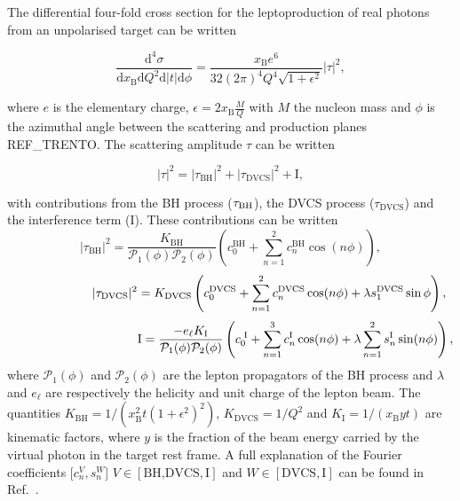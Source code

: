 The differential four-fold cross section for the leptoproduction of real photons
from an unpolarised target can be written \cite{Belitsky2002}
\begin{center}
\begin{equation}
\frac{\textrm{d}^4\sigma}{\textrm{d}x_{\textrm{B}}\textrm{d}Q^{2}\textrm{d}
|t|\textrm{d}\phi} =
\frac{x_{\textrm{B}}e^{6}}{32(2\pi)^{4} Q^{4}\sqrt{1+\epsilon^{2}}}
|\tau|^{2},
\end{equation}
\end{center}
where $e$ is the elementary
charge, $\epsilon=2x_\textrm{B}\frac{M}{Q}$ with $M$
the nucleon mass and $\phi$ is the
azimuthal angle between the scattering and production planes REF\_TRENTO.
The scattering amplitude $\tau$ can be written
\begin{center}
\begin{equation}
|\tau|^{2} = |\tau_{\textrm{BH}}|^{2} +
|\tau_{\textrm{DVCS}}|^{2} + \textrm{I},
\end{equation}
\end{center}
with contributions from the \textrm{BH} process ($\tau_{\textrm{\textrm{BH}}}$),
the DVCS process
($\tau_{\textrm{DVCS}}$) and the interference term (I). These
contributions can be written 
\begin{equation}
 |\tau_{\textrm{BH}}|^{2} =
\frac{K_{\textrm{BH}}}{\mathcal{P}_{1}(\phi)\mathcal{P}_{2}(\phi)}
\left(c_{0}^{
\textrm{BH}} + \sum_{n=1}^2 c_{n}^{\textrm{BH}}\cos(n\phi)\right),
\label{e:tbh}
\end{equation}
\begin{equation}
 \hspace{2.2cm}|\tau_{\textrm{DVCS}}|^{2} =
K_{\textrm{DVCS}}\left(c_{0}^{\textrm{DVCS}} +
\sum_{n=1}^2
c_{n}^{\textrm{DVCS}}\cos(n\phi) + \lambda
s_{1}^{\textrm{DVCS}}\sin\phi\right),
\label{e:tdvcs}
\end{equation}
\begin{equation}
\hspace{3.7cm} \textrm{I} = \frac{- e_\ell
K_{\textrm{I}}}{\mathcal{P}_{1}(\phi)\mathcal{P}_{2}(\phi)}\left(c_{0}^{\textrm{
I}}
+
\sum_{n=1}^3 c_{n}^{\textrm{I}}\cos(n\phi) + \lambda \sum_{n=1}^2
s_{n}^{\textrm{I}}\sin(n\phi)\right),
\label{e:ti}
\end{equation}
where $\mathcal{P}_1(\phi)$ and $\mathcal{P}_2(\phi)$ are the lepton propagators
of the BH process and $\lambda$ and $e_\ell$ are respectively the
helicity and unit charge of the lepton beam.  The
quantities $K_{\textrm{BH}}=1/(x_\textrm{B}^2t(1+\epsilon^2)^2)$,
$K_{\textrm{DVCS}}=1/Q^2$
and $K_{\textrm{I}}=1/(x_{\textrm{B}}yt)$ are kinematic factors, where
$y$ is the fraction of the beam energy carried by the virtual photon in
the target rest frame. A full
explanation of the Fourier coefficients [$c_n^V,s_n^W$]
\blue{(}$V\in[\textrm{BH,DVCS},\textrm{I}]$ and $W\in[\textrm{DVCS},\textrm{I}]$\blue{)} can be
found in
Ref.~\cite{Belitsky2002}.

